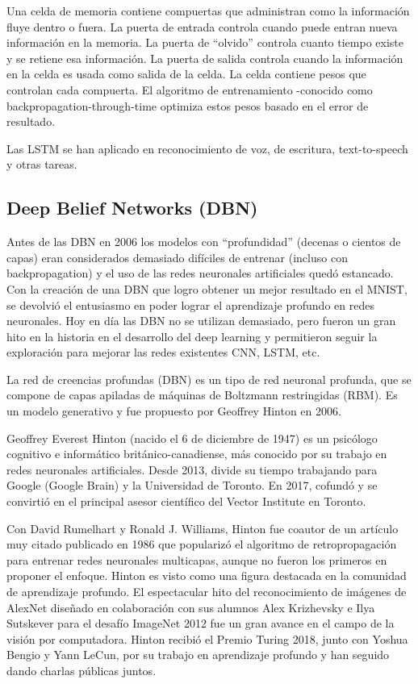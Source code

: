 \documentclass[a4paper]{article}
\begin{document}
Una celda de memoria contiene compuertas que administran como la información fluye dentro o fuera. La puerta de entrada controla cuando puede entran nueva información en la memoria. La puerta de “olvido” controla cuanto tiempo existe y se retiene esa información. La puerta de salida controla cuando la información en la celda es usada como salida de la celda. La celda contiene pesos que controlan cada compuerta. El algoritmo de entrenamiento -conocido como backpropagation-through-time optimiza estos pesos basado en el error de resultado.

Las LSTM se han aplicado en reconocimiento de voz, de escritura, text-to-speech y otras tareas.


\subsection{Deep Belief Networks (DBN)}
Antes de las DBN en 2006 los modelos con “profundidad” (decenas o cientos de capas) eran considerados demasiado difíciles de entrenar (incluso con backpropagation) y el uso de las redes neuronales artificiales quedó estancado. Con la creación de una DBN que logro obtener un mejor resultado en el MNIST, se devolvió el entusiasmo en poder lograr el aprendizaje profundo en redes neuronales. Hoy en día las DBN no se utilizan demasiado, pero fueron un gran hito en la historia en el desarrollo del deep learning y permitieron seguir la exploración para mejorar las redes existentes CNN, LSTM, etc.

La red de creencias profundas (DBN) es un tipo de red neuronal profunda, que se compone de capas apiladas de máquinas de Boltzmann restringidas (RBM). Es un modelo generativo y fue propuesto por Geoffrey Hinton en 2006.

Geoffrey Everest Hinton (nacido el 6 de diciembre de 1947) es un psicólogo cognitivo e informático británico-canadiense, más conocido por su trabajo en redes neuronales artificiales. Desde 2013, divide su tiempo trabajando para Google (Google Brain) y la Universidad de Toronto. En 2017, cofundó y se convirtió en el principal asesor científico del Vector Institute en Toronto.

Con David Rumelhart y Ronald J. Williams, Hinton fue coautor de un artículo muy citado publicado en 1986 que popularizó el algoritmo de retropropagación para entrenar redes neuronales multicapas, aunque no fueron los primeros en proponer el enfoque. Hinton es visto como una figura destacada en la comunidad de aprendizaje profundo. El espectacular hito del reconocimiento de imágenes de AlexNet diseñado en colaboración con sus alumnos Alex Krizhevsky e Ilya Sutskever para el desafío ImageNet 2012 fue un gran avance en el campo de la visión por computadora.
Hinton recibió el Premio Turing 2018, junto con Yoshua Bengio y Yann LeCun, por su trabajo en aprendizaje profundo y han seguido dando charlas públicas juntos.
\end{document}
